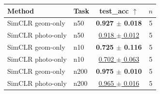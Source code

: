\begin{tabular}{llcc}
\toprule
Method & Task & test\_acc $\uparrow$ & $n$ \\
\midrule
SimCLR geom-only & n50 & \textbf{0.927 $\pm$ 0.018} & 5 \\
SimCLR photo-only & n50 & \underline{0.918 $\pm$ 0.012} & 5 \\
\midrule
SimCLR geom-only & n10 & \textbf{0.725 $\pm$ 0.116} & 5 \\
SimCLR photo-only & n10 & \underline{0.702 $\pm$ 0.063} & 5 \\
\midrule
SimCLR geom-only & n200 & \textbf{0.975 $\pm$ 0.010} & 5 \\
SimCLR photo-only & n200 & \underline{0.965 $\pm$ 0.016} & 5 \\
\bottomrule
\end{tabular}
